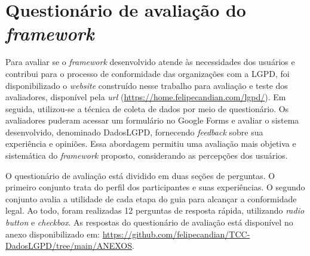 \documentclass[
	12pt,				%
	openright,			%
	oneside,			%
	a4paper,			%
	english,			%
	french,				%
	spanish,			%
	brazil,				%
	]{abntex2}
\begin{document}
\section{Questionário de avaliação do \textit{framework} }

Para avaliar se o \textit{framework} desenvolvido atende às necessidades dos usuários e contribui para o processo de conformidade das organizações com a LGPD, foi disponibilizado o \textit{website} construído nesse trabalho para avaliação e teste dos avaliadores, disponível pela \textit{url} (\url{https://home.felipecandian.com/lgpd/}). Em seguida, utilizou-se a técnica de coleta de dados por meio de questionário. Os avaliadores puderam acessar um formulário no Google Forms e avaliar o sistema desenvolvido, denominado DadosLGPD, fornecendo \textit{feedback} sobre sua experiência e opiniões. Essa abordagem permitiu uma avaliação mais objetiva e sistemática do \textit{framework} proposto, considerando as percepções dos usuários.



O questionário de avaliação está dividido em duas seções de perguntas. O primeiro conjunto trata do perfil dos participantes e suas experiências. O segundo conjunto avalia a utilidade de cada etapa do guia para alcançar a conformidade legal. Ao todo, foram realizadas 12 perguntas de resposta rápida, utilizando \textit{radio button} e \textit{checkbox}. As respostas do questionário de avaliação está disponível no anexo disponibilizado em: \url{https://github.com/felipecandian/TCC-DadosLGPD/tree/main/ANEXOS}.
\end{document}
